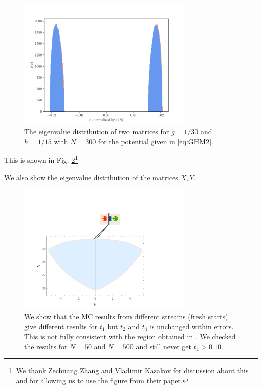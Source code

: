 \documentclass[11pt]{article}
\begin{document}
\begin{figure}[htbp] 
	\centering 
	\includegraphics[width=0.75\textwidth]{figs/2MM_dist_symbroken.pdf}
	\caption{\label{fig:2MM_evd}The eigenvalue distribution of two matrices for $g=1/30$ and $h=1/15$ 
	with $N=300$ for the potential given in \ref{eq:GHM2}.}
\end{figure}

This is shown in Fig. \ref{fig:2MM_comp1}\footnote{We thank Zechuang Zhang and Vladimir Kazakov for discussion about this and for allowing us to use the figure from their paper.}


We also show the eigenvalue distribution of the matrices $X, Y$. 

\begin{figure}[htbp] 
	\centering 
	\includegraphics[width=0.75\textwidth]{figs/2MM_symb_comp.pdf}
	\caption{\label{fig:2MM_comp1}We show that the MC results from different streams (fresh starts) give different results for $t_{1}$ but $t_{2}$ and $t_{4}$ is unchanged within errors. This is not fully consistent with the region obtained in \cite{Kazakov:2021lel}. We checked the results for $N=50$ and $N=500$ and still never get $t_{1} > 0.10$.}
	
\end{figure}
\end{document}
